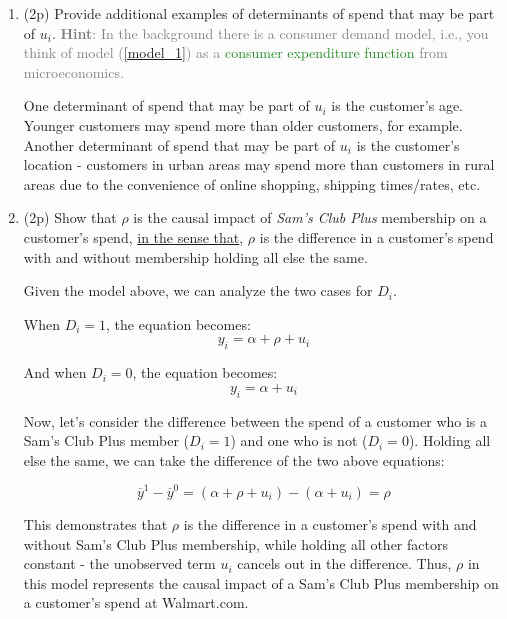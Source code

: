 \documentclass{article}
\newcommand{\gap}{\vspace{1 em}}
\begin{document}
\begin{enumerate}[label=\textbf{Q\arabic{enumi}}.,ref=Q\arabic{enumi}, wide=0pt, itemsep=1em, topsep=5pt]
    \begin{enumerate}
        \item (2p) Provide additional examples of determinants of spend that may be part of $u _{i}$. \textcolor{gray}{\textbf{Hint}: In the background there is a consumer demand model, i.e., you think of model (\ref{model_1}) as a \textcolor{ForestGreen}{consumer expenditure function} from microeconomics.}
        \begin{solution}
            {
                One determinant of spend that may be part of $u_i$ is the customer's age. Younger customers may spend more than older customers, for example. Another determinant of spend that may be part of $u_i$ is the customer's location - customers in urban areas may spend more than customers in rural areas due to the convenience of online shopping, shipping times/rates, etc.
            }
        \end{solution}
        \gap
        \item (2p) Show that $\rho$ is the causal impact of \textit{Sam's Club Plus} membership on a customer's spend, \newline\underline{in the sense that}, $\rho$ is the difference in a customer's spend with and without membership holding all else the same.
        \begin{solution}
            {
                Given the model above, we can analyze the two cases for $D_i$.
                
                When $D_{i} = 1$, the equation becomes:
                \[ y_{i} = \alpha + \rho + u_{i} \]

                And when $D_{i} = 0$, the equation becomes:
                \[ y_{i} = \alpha + u_{i} \]

                Now, let's consider the difference between the spend of a customer who is a Sam's Club Plus member ($D_{i} = 1$) and one who is not ($D_{i} = 0$). Holding all else the same, we can take the difference of the two above equations:

                \[ \overline{y}^{1} - \overline{y}^{0} = \left( \alpha + \rho + u_{i} \right) - \left( \alpha + u_{i} \right) = \rho \]

                This demonstrates that $\rho$ is the difference in a customer's spend with and without Sam's Club Plus membership, while holding all other factors constant - the unobserved term $u_{i}$ cancels out in the difference. Thus, $\rho$ in this model represents the causal impact of a Sam's Club Plus membership on a customer's spend at Walmart.com.
            }
        \end{solution}


\end{enumerate}
\end{enumerate}
\end{document}
